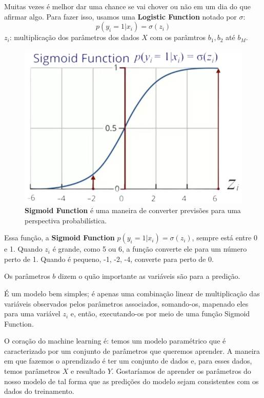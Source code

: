 \documentclass[11pt, a4paper]{article}
\begin{document}
Muitas vezes é melhor dar uma chance se vai chover ou não em um dia do que afirmar algo. Para fazer isso, usamos uma \textbf{Logistic Function} notado por $\sigma$:
$$ p(y_i = 1 | x_i) = \sigma (z_i) $$
$z_i$: multiplicação dos parâmetros dos dados $X$ com os parâmtros $b_1, b_2$ até $b_M$.


\begin{figure}[h]
\centering
\includegraphics[scale=0.4]{sigmoid_function}
\caption{
\centering
\textbf{Sigmoid Function} é uma maneira de converter previsões para uma perspectiva probabilística.}
\end{figure}


Essa função, a \textbf{Sigmoid Function} $p(y_i = 1 | x_i) = \sigma(z_i)$, sempre está entre 0 e 1. Quando $z_i$ é grande, como 5 ou 6, a função converte ele para um número perto de 1. Quando é pequeno, -1, -2, -4, converte para perto de 0.

Os parâmetros $b$ dizem o quão importante as variáveis são para a predição.

É um modelo bem simples; é apenas uma combinação linear de multiplicação das variáveis observados pelos parâmetros associados, somando-os, mapenado eles para uma variável $z_i$ e, então, executando-os por meio de uma função Sigmoid Function.


O coração do machine learning é: temos um modelo paramétrico que é caracterizado por um conjunto de parâmetros que queremos aprender. A maneira em que fazemos o aprendizado é ter um conjunto de dados e, para esses dados, temos parâmetros $X$ e resultado $Y$. Gostaríamos de aprender os parâmetros do nosso modelo de tal forma que as predições do modelo sejam consistentes com os dados do treinamento.
\end{document}
